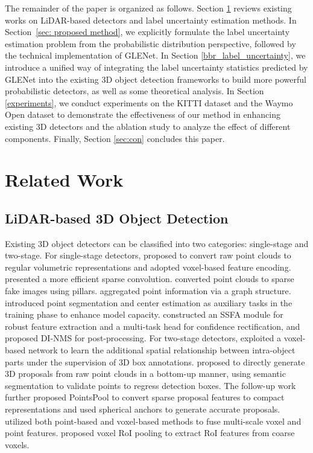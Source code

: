 \documentclass[twocolumn]{svjour3}
\begin{document}
The remainder of the paper is organized as follows. 
Section \ref{sec:RW} reviews existing works on 
LiDAR-based detectors and label uncertainty estimation methods. 
In Section~\ref{sec: proposed method}, we explicitly formulate the label uncertainty estimation problem from the probabilistic distribution perspective, followed by the technical implementation of GLENet.
In Section \ref{bbr_label_uncertainty}, we introduce a unified way of integrating the label uncertainty statistics predicted by GLENet into the existing 3D object detection frameworks to build more powerful probabilistic detectors, as well as some theoretical analysis.
In Section \ref{experiments}, we conduct experiments on the KITTI dataset and the Waymo Open dataset to demonstrate the effectiveness of our method in enhancing existing 3D detectors and the ablation study to analyze the effect of different components. Finally, Section \ref{sec:con} concludes this paper.




\section{Related Work}
\label{sec:RW}
\subsection{LiDAR-based 3D Object Detection}
Existing 3D object detectors can be classified into two categories: single-stage and two-stage. For single-stage detectors, \cite{Zhou_2018_CVPR} proposed to convert raw point clouds to regular volumetric representations and adopted voxel-based feature encoding. \cite{yan2018second} presented a more efficient sparse convolution. \cite{Lang_2019_CVPR} converted point clouds to sparse fake images using pillars. \cite{Shi_2020_CVPR} aggregated point information via a graph structure. \cite{He_2020_CVPR} introduced point segmentation and center estimation as auxiliary tasks in the training phase to enhance model capacity. \cite{zheng2021cia} constructed an SSFA module for robust feature extraction and a multi-task head for confidence rectification, and proposed DI-NMS for post-processing. For two-stage detectors, \cite{shi2020points} exploited a voxel-based network to learn the additional spatial relationship between intra-object parts under the supervision of 3D box annotations. \cite{shi2019pointrcnn} proposed to directly generate 3D proposals from raw point clouds in a bottom-up manner, using semantic segmentation to validate points to regress detection boxes. The follow-up work \citep{yang2019std} further proposed PointsPool to convert sparse proposal features to compact representations and used spherical anchors to generate accurate proposals. \cite{shi2020pv} utilized both point-based and voxel-based methods to fuse multi-scale voxel and point features. \cite{deng2021voxel} proposed voxel RoI pooling to extract RoI features from coarse voxels.
\end{document}
